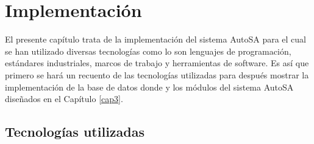 \chapter{Implementación}\label{cap4}
El presente capítulo trata de la implementación del sistema AutoSA para el cual se han utilizado diversas tecnologías como lo son lenguajes de programación, estándares industriales, marcos de trabajo y herramientas de software. Es así que primero se hará un recuento de las tecnologías utilizadas para después mostrar la implementación de la base de datos donde y los módulos del sistema AutoSA diseñados en el Capítulo \ref{cap3}.
\section{Tecnologías utilizadas}
